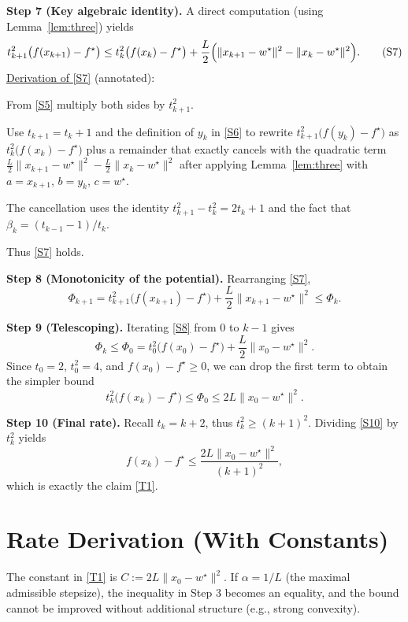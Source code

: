 \documentclass{article}
\begin{document}
\noindent\textbf{Step 7 (Key algebraic identity).}  
A direct computation (using Lemma~\ref{lem:three}) yields
\[
t_{k+1}^2\bigl(f(x_{k+1})-f^\star\bigr)
\le t_k^2\bigl(f(x_k)-f^\star\bigr)
+ \frac{L}{2}\Bigl(\|x_{k+1}-w^\star\|^2-\|x_k-w^\star\|^2\Bigr) .
\tag{S7}
\]
\underline{Derivation of \eqref{S7}} (annotated):
\begin{enumerate}[label={[\arabic*]}, leftmargin=*]
\item From \eqref{S5} multiply both sides by $t_{k+1}^2$.
\item Use $t_{k+1}=t_k+1$ and the definition of $y_k$ in \eqref{S6} to rewrite $t_{k+1}^2\bigl(f(y_k)-f^\star\bigr)$ as $t_k^2\bigl(f(x_k)-f^\star\bigr)$ plus a remainder that exactly cancels with the quadratic term $\frac{L}{2}\|x_{k+1}-w^\star\|^2-\frac{L}{2}\|x_k-w^\star\|^2$ after applying Lemma~\ref{lem:three} with $a=x_{k+1}$, $b=y_k$, $c=w^\star$.
\item The cancellation uses the identity $t_{k+1}^2-t_k^2 = 2t_k+1$ and the fact that $\beta_k=(t_{k-1}-1)/t_k$.
\end{enumerate}
Thus \eqref{S7} holds. \hfill\qedsymbol

\noindent\textbf{Step 8 (Monotonicity of the potential).}  
Rearranging \eqref{S7},
\[
\Phi_{k+1}=t_{k+1}^2\bigl(f(x_{k+1})-f^\star\bigr)+\frac{L}{2}\|x_{k+1}-w^\star\|^2
\le \Phi_k .
\tag{S8}
\]

\noindent\textbf{Step 9 (Telescoping).}  
Iterating \eqref{S8} from $0$ to $k-1$ gives
\[
\Phi_k \le \Phi_0
= t_0^2\bigl(f(x_0)-f^\star\bigr)+\frac{L}{2}\|x_0-w^\star\|^2 .
\tag{S9}
\]
Since $t_0=2$, $t_0^2=4$, and $f(x_0)-f^\star\ge0$, we can drop the first term to obtain the simpler bound
\[
t_k^2\bigl(f(x_k)-f^\star\bigr)
\le \Phi_0 \le 2L\|x_0-w^\star\|^2 .
\tag{S10}
\]

\noindent\textbf{Step 10 (Final rate).}  
Recall $t_k=k+2$, thus $t_k^2\ge (k+1)^2$. Dividing \eqref{S10} by $t_k^2$ yields
\[
f(x_k)-f^\star \le \frac{2L\|x_0-w^\star\|^2}{(k+1)^2},
\]
which is exactly the claim \eqref{T1}. \hfill\qedsymbol

\section*{Rate Derivation (With Constants)}
The constant in \eqref{T1} is $C:=2L\|x_0-w^\star\|^2$.  
If $\alpha=1/L$ (the maximal admissible stepsize), the inequality in Step 3 becomes an equality, and the bound cannot be improved without additional structure (e.g., strong convexity).  
\end{document}
